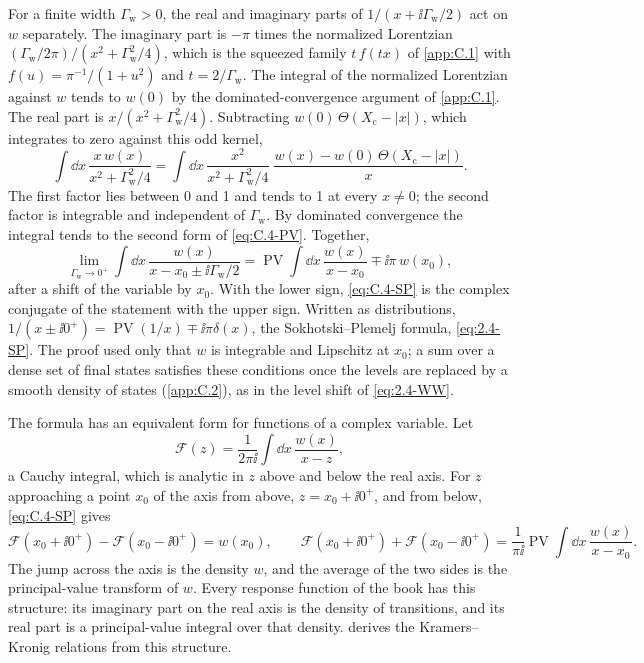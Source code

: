 For a finite width $\varGamma_{\mathrm{w}} > 0$, the real and imaginary parts of $1/(x + \ii\varGamma_{\mathrm{w}}/2)$ act on $w$ separately. The imaginary part is $-\pi$ times the normalized Lorentzian $(\varGamma_{\mathrm{w}}/2\pi)/(x^2 + \varGamma_{\mathrm{w}}^2/4)$, which is the squeezed family $t\,f(tx)$ of \cref{app:C.1} with $f(u) = \pi^{-1}/(1 + u^2)$ and $t = 2/\varGamma_{\mathrm{w}}$. The integral of the normalized Lorentzian against $w$ tends to $w(0)$ by the dominated-convergence argument of \cref{app:C.1}. The real part is $x/(x^2 + \varGamma_{\mathrm{w}}^2/4)$. Subtracting $w(0)\,\Theta(X_{\mathrm{c}} - |x|)$, which integrates to zero against this odd kernel,
\begin{equation*}
  \int\dd x\,\frac{x\,w(x)}{x^2 + \varGamma_{\mathrm{w}}^2/4} = \int\dd x\,\frac{x^2}{x^2 + \varGamma_{\mathrm{w}}^2/4}\;\frac{w(x) - w(0)\,\Theta(X_{\mathrm{c}} - |x|)}{x} .
\end{equation*}
The first factor lies between 0 and 1 and tends to 1 at every $x \neq 0$; the second factor is integrable and independent of $\varGamma_{\mathrm{w}}$. By dominated convergence the integral tends to the second form of \cref{eq:C.4-PV}. Together,
\begin{equation}
  \lim_{\varGamma_{\mathrm{w}}\to0^+}\int\dd x\,\frac{w(x)}{x - x_0 \pm \ii\varGamma_{\mathrm{w}}/2} = \operatorname{PV}\!\int\dd x\,\frac{w(x)}{x - x_0} \mp \ii\pi\,w(x_0) ,
  \label{eq:C.4-SP}
\end{equation}
after a shift of the variable by $x_0$. With the lower sign, \cref{eq:C.4-SP} is the complex conjugate of the statement with the upper sign. Written as distributions, $1/(x \pm \ii0^+) = \operatorname{PV}(1/x) \mp \ii\pi\delta(x)$, the Sokhotski--Plemelj formula, \cref{eq:2.4-SP}. The proof used only that $w$ is integrable and Lipschitz at $x_0$; a sum over a dense set of final states satisfies these conditions once the levels are replaced by a smooth density of states (\cref{app:C.2}), as in the level shift of \cref{eq:2.4-WW}.

The formula has an equivalent form for functions of a complex variable. Let
\begin{equation}
  \mathcal{F}(z) = \frac{1}{2\pi\ii}\int\dd x\,\frac{w(x)}{x - z} ,
  \label{eq:C.4-cauchy}
\end{equation}
a Cauchy integral, which is analytic in $z$ above and below the real axis. For $z$ approaching a point $x_0$ of the axis from above, $z = x_0 + \ii0^+$, and from below, \cref{eq:C.4-SP} gives
\begin{equation}
  \mathcal{F}(x_0 + \ii0^+) - \mathcal{F}(x_0 - \ii0^+) = w(x_0), \qquad
  \mathcal{F}(x_0 + \ii0^+) + \mathcal{F}(x_0 - \ii0^+) = \frac{1}{\pi\ii}\operatorname{PV}\!\int\dd x\,\frac{w(x)}{x - x_0} .
  \label{eq:C.4-jump}
\end{equation}
The jump across the axis is the density $w$, and the average of the two sides is the principal-value transform of $w$. Every response function of the book has this structure: its imaginary part on the real axis is the density of transitions, and its real part is a principal-value integral over that density.  derives the Kramers--Kronig relations from this structure.


